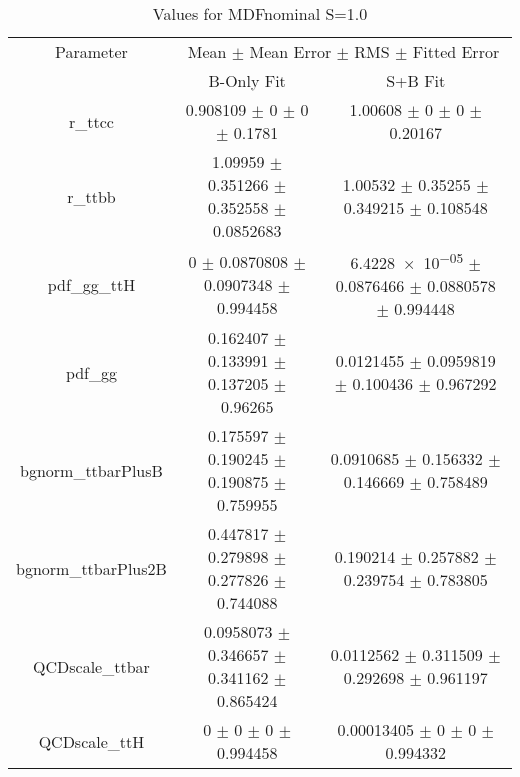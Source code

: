 \begin{table}
\centering
\caption{Values for MDFnominal S=1.0}
\begin{tabular}{ccc}
\toprule
Parameter & \multicolumn{2}{c}{Mean $\pm$ Mean Error $\pm$ RMS $\pm$ Fitted Error}\\
 & B-Only Fit & S+B Fit\\
\midrule
r\_ttcc & \num{0.908109} $\pm$ \num{0} $\pm$ \num{0} $\pm$ \num{0.1781} & \num{1.00608} $\pm$ \num{0} $\pm$ \num{0} $\pm$ \num{0.20167}\\
r\_ttbb & \num{1.09959} $\pm$ \num{0.351266} $\pm$ \num{0.352558} $\pm$ \num{0.0852683} & \num{1.00532} $\pm$ \num{0.35255} $\pm$ \num{0.349215} $\pm$ \num{0.108548}\\
pdf\_gg\_ttH & \num{0} $\pm$ \num{0.0870808} $\pm$ \num{0.0907348} $\pm$ \num{0.994458} & \num{6.4228e-05} $\pm$ \num{0.0876466} $\pm$ \num{0.0880578} $\pm$ \num{0.994448}\\
pdf\_gg & \num{0.162407} $\pm$ \num{0.133991} $\pm$ \num{0.137205} $\pm$ \num{0.96265} & \num{0.0121455} $\pm$ \num{0.0959819} $\pm$ \num{0.100436} $\pm$ \num{0.967292}\\
bgnorm\_ttbarPlusB & \num{0.175597} $\pm$ \num{0.190245} $\pm$ \num{0.190875} $\pm$ \num{0.759955} & \num{0.0910685} $\pm$ \num{0.156332} $\pm$ \num{0.146669} $\pm$ \num{0.758489}\\
bgnorm\_ttbarPlus2B & \num{0.447817} $\pm$ \num{0.279898} $\pm$ \num{0.277826} $\pm$ \num{0.744088} & \num{0.190214} $\pm$ \num{0.257882} $\pm$ \num{0.239754} $\pm$ \num{0.783805}\\
QCDscale\_ttbar & \num{0.0958073} $\pm$ \num{0.346657} $\pm$ \num{0.341162} $\pm$ \num{0.865424} & \num{0.0112562} $\pm$ \num{0.311509} $\pm$ \num{0.292698} $\pm$ \num{0.961197}\\
QCDscale\_ttH & \num{0} $\pm$ \num{0} $\pm$ \num{0} $\pm$ \num{0.994458} & \num{0.00013405} $\pm$ \num{0} $\pm$ \num{0} $\pm$ \num{0.994332}\\
\bottomrule
\end{tabular}
\end{table}